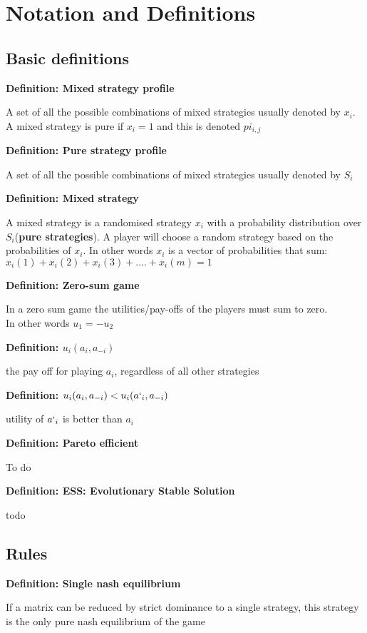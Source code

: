 \documentclass[11pt]{report}
\newcommand{\define}[2] {
  \textbf{Definition: #1}
  \begin{center} #2
\end{center}
}
\begin{document}
\chapter{Notation and Definitions }

\section{Basic definitions}
\define{Mixed strategy profile}{A set of all the possible combinations of mixed strategies usually denoted by $x_{i}$. A mixed strategy is pure if $x_{i} = 1$ and this is denoted $pi_{i, j}$}
\define{Pure strategy profile}{A set of all the possible combinations of mixed strategies usually denoted by $S_{i}$}
\define{Mixed strategy}{ A mixed strategy is a randomised strategy $x_i$ with a probability distribution over $S_i$(\textbf{pure strategies}). A player will choose a random strategy based on the probabilities of $x_{i}$. In other words $x_{i}$ is a vector of probabilities that sum: \\ $x_{i}(1) + x_{i}(2) + x_{i}(3) + .... + x_{i}(m) = 1$ }
\define{Zero-sum game}{In a zero sum game the utilities/pay-offs of the players must sum to zero. \\ In other words $u_{1} = -u_{2}$}
\define{$u_{i}(a_{i}, a_{-i})$}{the pay off for playing $a_{i}$, regardless of all other strategies}
\define{$u_{i}(a_{i}, a_{-i}) < u_{i}(a`_{i}, a_{-i})$}{utility of $a`_{i}$ is better than $a_{i}$}
\define{Pareto efficient}{To do}
\define{ESS: Evolutionary Stable Solution}{todo}

\section{Rules}

\define{Single nash equilibrium}{If a matrix can be reduced by strict dominance to a single strategy, this strategy is the only pure nash equilibrium of the game}
\end{document}
